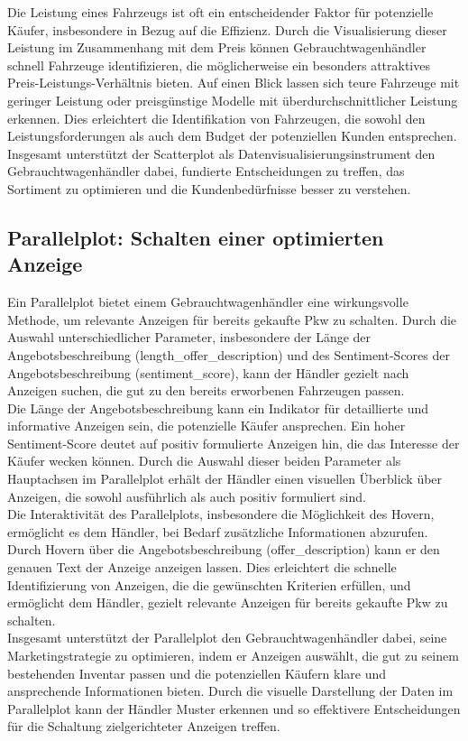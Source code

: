 Die Leistung eines Fahrzeugs ist oft ein entscheidender Faktor für potenzielle Käufer, insbesondere in Bezug auf die  Effizienz. Durch die Visualisierung dieser Leistung im Zusammenhang mit dem Preis können Gebrauchtwagenhändler schnell Fahrzeuge identifizieren, die möglicherweise ein besonders attraktives Preis-Leistungs-Verhältnis bieten. Auf einen Blick lassen sich teure Fahrzeuge mit geringer Leistung oder preisgünstige Modelle mit überdurchschnittlicher Leistung erkennen. Dies erleichtert die Identifikation von Fahrzeugen, die sowohl den Leistungsforderungen als auch dem Budget der potenziellen Kunden entsprechen. Insgesamt unterstützt der Scatterplot als Datenvisualisierungsinstrument den Gebrauchtwagenhändler dabei, fundierte Entscheidungen zu treffen, das Sortiment zu optimieren und die Kundenbedürfnisse besser zu verstehen. \\

\subsection{Parallelplot: Schalten einer optimierten Anzeige}

Ein Parallelplot bietet einem Gebrauchtwagenhändler eine wirkungsvolle Methode, um relevante Anzeigen für bereits gekaufte Pkw zu schalten. Durch die Auswahl unterschiedlicher Parameter, insbesondere der Länge der Angebotsbeschreibung (length\_offer\_description) und des Sentiment-Scores der Angebotsbeschreibung (sentiment\_score), kann der Händler gezielt nach Anzeigen suchen, die gut zu den bereits erworbenen Fahrzeugen passen. \\

Die Länge der Angebotsbeschreibung kann ein Indikator für detaillierte und informative Anzeigen sein, die potenzielle Käufer ansprechen. Ein hoher Sentiment-Score deutet auf positiv formulierte Anzeigen hin, die das Interesse der Käufer wecken können. Durch die Auswahl dieser beiden Parameter als Hauptachsen im Parallelplot erhält der Händler einen visuellen Überblick über Anzeigen, die sowohl ausführlich als auch positiv formuliert sind. \\

Die Interaktivität des Parallelplots, insbesondere die Möglichkeit des Hovern, ermöglicht es dem Händler, bei Bedarf zusätzliche Informationen abzurufen. Durch Hovern über die Angebotsbeschreibung (offer\_description) kann er den genauen Text der Anzeige anzeigen lassen. Dies erleichtert die schnelle Identifizierung von Anzeigen, die die gewünschten Kriterien erfüllen, und ermöglicht dem Händler, gezielt relevante Anzeigen für bereits gekaufte Pkw zu schalten. \\

Insgesamt unterstützt der Parallelplot den Gebrauchtwagenhändler dabei, seine Marketingstrategie zu optimieren, indem er Anzeigen auswählt, die gut zu seinem bestehenden Inventar passen und die potenziellen Käufern klare und ansprechende Informationen bieten. Durch die visuelle Darstellung der Daten im Parallelplot kann der Händler Muster erkennen und so effektivere Entscheidungen für die Schaltung zielgerichteter Anzeigen treffen. \\